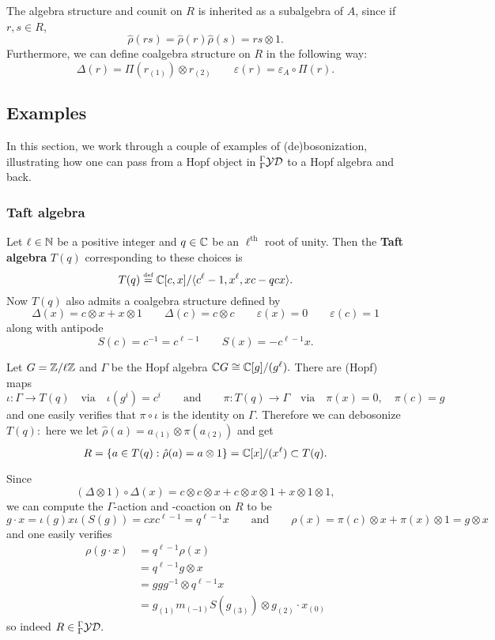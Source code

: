 \documentclass[12pt]{article}
\begin{document}
The algebra structure and counit on $R$ is inherited as a subalgebra of $A$, since if $r,s\in R$, \[\hat\rho(rs)=\hat\rho(r)\hat\rho(s)=rs\otimes 1.\]
Furthermore, we can define coalgebra structure on $R$ in the following way:
\[\Delta(r)=\Pi(r_{(1)})\otimes r_{(2)}\qquad \varepsilon(r)=\varepsilon_A\circ \Pi(r).\]

\subsection{Examples}
In this section, we work through a couple of examples of (de)bosonization, illustrating how one can pass from a Hopf object in ${^\Gamma_\Gamma\mathcal{YD}}$ to a Hopf algebra and back.
\subsubsection{Taft algebra}
Let $\ell\in\mathbb{N}$ be a positive integer and $q\in\mathbb{C}$ be an $\ell^\text{th}$ root of unity. Then the \textbf{Taft algebra} $T(q)$ corresponding to these choices is
\[T(q)\stackrel{\text{\tiny def}}{=} \mathbb{C}[c,x]/\langle c^\ell-1, x^\ell, xc-qcx\rangle.\]
Now $T(q)$ also admits a coalgebra structure defined by
\[\Delta(x)=c\otimes x + x\otimes 1\qquad \Delta(c)=c\otimes c\qquad \varepsilon(x)=0\qquad \varepsilon(c)=1\]
along with antipode
\[S(c)=c^{-1}=c^{\ell-1}\qquad S(x)=-c^{\ell-1}x.\]

Let $G=\mathbb{Z}/\ell\mathbb{Z}$ and $\Gamma$ be the Hopf algebra $\mathbb{C} G\cong\mathbb{C}[g]/(g^\ell).$ There are (Hopf) maps
\[\iota:\Gamma\to T(q)\quad\text{via}\quad \iota(g^i)=c^i\qquad\text{and}\qquad \pi:T(q)\to \Gamma\quad\text{via}\quad \pi(x)=0,\quad\pi(c)=g\]
and one easily verifies that $\pi\circ\iota$ is the identity on $\Gamma.$ Therefore we can debosonize $T(q):$ here we let $\hat\rho(a)=a_{(1)}\otimes \pi(a_{(2)})$ and get
\[R=\{a\in T(q):\hat\rho(a)=a\otimes 1\}=\mathbb{C}[x]/(x^\ell)\subset T(q).\]

Since
\[(\Delta\otimes 1)\circ\Delta(x)=c\otimes c\otimes x+c\otimes x\otimes 1+x\otimes 1\otimes 1,\]
we can compute the $\Gamma$-action and -coaction on $R$ to be
\[g\cdot x = \iota(g)x\iota(S(g))=cxc^{\ell-1}=q^{\ell-1}x\qquad\text{and}\qquad\rho(x)=\pi(c)\otimes x + \pi(x)\otimes 1 = g\otimes x\]
and one easily verifies
\begin{align*}
    \rho(g\cdot x)&=q^{\ell-1}\rho(x)\\
    &=q^{\ell-1}g\otimes x\\
    &=ggg^{-1}\otimes q^{\ell-1}x\\
    &=g_{(1)}m_{(-1)}S(g_{(3)})\otimes g_{(2)}\cdot x_{(0)}
\end{align*}
so indeed $R\in{^\Gamma_\Gamma\mathcal{YD}}.$
\end{document}

